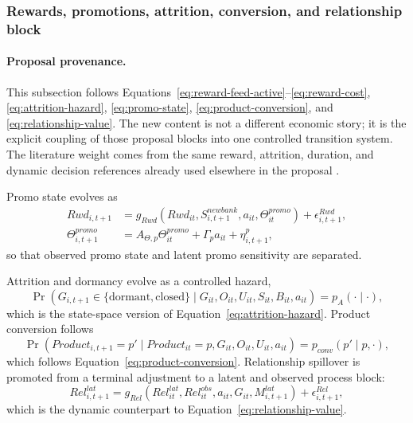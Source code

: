\documentclass[11pt]{article}
\newcommand{\1}{\mathbf{1}}
\begin{document}
\subsubsection{Rewards, promotions, attrition, conversion, and relationship block}
\label{subsec:state-space-promo-attrition}

\paragraph{Proposal provenance.}
This subsection follows Equations~\eqref{eq:reward-feed-active}--\eqref{eq:reward-cost},
\eqref{eq:attrition-hazard}, \eqref{eq:promo-state},
\eqref{eq:product-conversion}, and \eqref{eq:relationship-value}. The new
content is not a different economic story; it is the explicit coupling of those
proposal blocks into one controlled transition system. The literature weight
comes from the same reward, attrition, duration, and dynamic decision references
already used elsewhere in the proposal
\citep{agarwal2010rewards,schmittlein1987counting,fader2005bgnbd,
bolton1998duration,puterman1994mdp,murphy2003dynamic}.

Promo state evolves as
\begin{align}
  Rwd_{i,t+1}
    &= g_{Rwd}(Rwd_{it},S^{newbank}_{i,t+1},a_{it},\Theta^{promo}_{it})
       + \epsilon^{Rwd}_{i,t+1},
       \label{eq:ss-reward-transition}\\
  \Theta^{promo}_{i,t+1}
    &= A_{\Theta,p}\Theta^{promo}_{it} + \Gamma_p a_{it} + \eta^p_{i,t+1},
       \label{eq:ss-promo-latent}
\end{align}
so that observed promo state and latent promo sensitivity are separated.

Attrition and dormancy evolve as a controlled hazard,
\begin{equation}
  \Pr(G_{i,t+1}\in\{\mathrm{dormant},\mathrm{closed}\}
  \mid G_{it},O_{it},U_{it},S_{it},B_{it},a_{it})
  = p_A(\cdot\mid\cdot),
  \label{eq:ss-attrition-transition}
\end{equation}
which is the state-space version of Equation~\eqref{eq:attrition-hazard}.
Product conversion follows
\begin{equation}
  \Pr(Product_{i,t+1}=p'\mid Product_{it}=p,G_{it},O_{it},U_{it},a_{it})
  = p_{conv}(p'\mid p,\cdot),
  \label{eq:ss-conversion-transition}
\end{equation}
which follows Equation~\eqref{eq:product-conversion}. Relationship spillover is
promoted from a terminal adjustment to a latent and observed process block:
\begin{equation}
  Rel^{lat}_{i,t+1}
  =
  g_{Rel}(Rel^{lat}_{it},Rel^{obs}_{it},a_{it},G_{it},M^{lat}_{i,t+1})
  + \epsilon^{Rel}_{i,t+1},
  \label{eq:ss-relationship-transition}
\end{equation}
which is the dynamic counterpart to Equation~\eqref{eq:relationship-value}.
\end{document}
